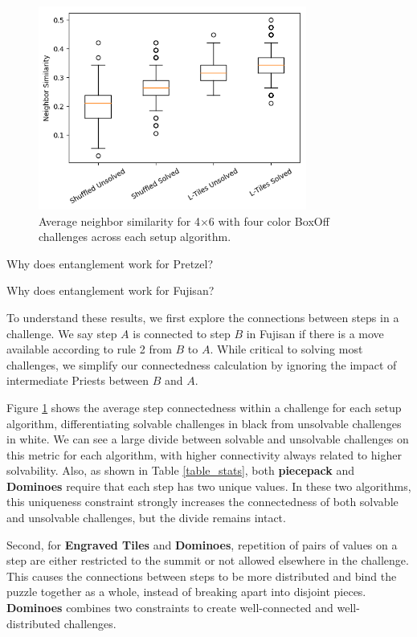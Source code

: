 \documentclass[journal]{IEEEtran}
\begin{document}
\begin{figure}[t]
\includegraphics[width=8.8cm]{boxoffneighborsim.png}
\caption{Average neighbor similarity for 4$\times$6 with four color BoxOff challenges across each setup algorithm. }
\label{fig:connected}
\end{figure}

Why does entanglement work for Pretzel?


Why does entanglement work for Fujisan?


To understand these results, we first explore the connections between steps in a challenge. We say step $A$ is connected to step $B$ in Fujisan if there is a move available according to rule 2 from $B$ to $A$. While critical to solving most challenges, we simplify our connectedness calculation by ignoring the impact of intermediate Priests between $B$ and $A$. 

Figure \ref{fig:connected} shows the average step connectedness within a challenge for each setup algorithm, differentiating solvable challenges in black from unsolvable challenges in white. We can see a large divide between solvable and unsolvable challenges on this metric for each algorithm, with higher connectivity always related to higher solvability. Also, as shown in Table \ref{table_stats}, both {\bf piecepack} and {\bf Dominoes} require that each step has two unique values. In these two algorithms, this uniqueness constraint strongly increases the connectedness of both solvable and unsolvable challenges, but the divide remains intact.

Second, for {\bf Engraved Tiles} and {\bf Dominoes}, repetition of pairs of values on a step are either restricted to the summit or not allowed elsewhere in the challenge. This causes the connections between steps to be more distributed and bind the puzzle together as a whole, instead of breaking apart into disjoint pieces. {\bf Dominoes} combines two constraints to create well-connected and well-distributed challenges.
\end{document}
